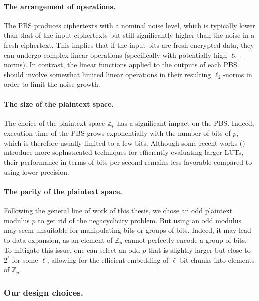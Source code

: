 \paragraph{The arrangement of operations.} The PBS produces ciphertexts with a nominal noise level, which is typically lower than that of the input ciphertexts but still significantly higher than the noise in a fresh ciphertext. This implies that if the input bits are fresh encrypted data, they can undergo complex linear operations (specifically with potentially high $\ell_2$-norms). In contrast, the linear functions applied to the outputs of each PBS should involve somewhat limited linear operations in their resulting  $\ell_2$-norms in order to limit the noise growth.

\paragraph{The size of the plaintext space.} The choice of the plaintext space $\mathbb{Z}_p$ has a significant impact on the PBS. Indeed, execution time of the PBS grows exponentially with the number of bits of $p$, which is therefore usually limited to a few bits. Although some recent works (\cite{TCHES:GuiBorAra21,AC:CLOT21,EPRINT:CZBSG22,TCHES:KluSch23}) introduce more sophisticated techniques for efficiently evaluating larger LUTs, their performance in terms of bits per second remains less favorable compared to using lower precision.


\paragraph{The parity of the plaintext space.} Following the general line of work of this thesis, we chose an odd plaintext modulus $p$ to get rid of the negacyclicity problem. But using an odd modulus may seem unsuitable for manipulating bits or groups of bits. Indeed, it may lead to data expansion, as an element of \( \mathbb{Z}_p \) cannot perfectly encode a group of bits. To mitigate this issue, one can select an odd $p$ that is slightly larger but close to $2^\ell$ for some $\ell$, allowing for the efficient embedding of $\ell$-bit chunks into elements of $\mathbb{Z}_p$. 


\subsubsection{Our design choices.} 

